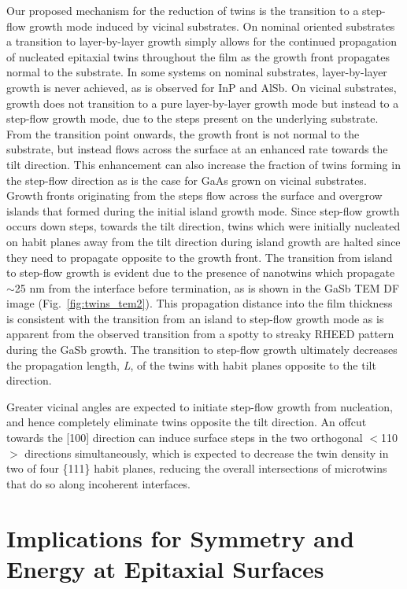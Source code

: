 Our proposed mechanism for the reduction of twins is the transition to a step-flow growth mode induced by vicinal substrates. On nominal oriented substrates a transition to layer-by-layer growth simply allows for the continued propagation of nucleated epitaxial twins throughout the film as the growth front propagates normal to the substrate. In some systems on nominal substrates, layer-by-layer growth is never achieved, as is observed for InP and AlSb. On vicinal substrates, growth does not transition to a pure layer-by-layer growth mode but instead to a step-flow growth mode, due to the steps present on the underlying substrate. From the transition point onwards, the growth front is not normal to the substrate, but instead flows across the surface at an enhanced rate towards the tilt direction. This enhancement can also increase the fraction of twins forming in the step-flow direction as is the case for GaAs grown on vicinal substrates. Growth fronts originating from the steps flow across the surface and overgrow islands that formed during the initial island growth mode. Since step-flow growth occurs down steps, towards the tilt direction, twins which were initially nucleated on habit planes away from the tilt direction during island growth are halted since they need to propagate opposite to the growth front. The transition from island to step-flow growth is evident due to the presence of nanotwins which propagate $\sim$25 nm from the interface before termination, as is shown in the GaSb TEM DF image (Fig.~\ref{fig:twins_tem2}). This propagation distance into the film thickness is consistent with the transition from an island to step-flow growth mode as is apparent from the observed transition from a spotty to streaky RHEED pattern during the GaSb growth. The transition to step-flow growth ultimately decreases the propagation length, \textit{L}, of the twins with habit planes opposite to the tilt direction. 

Greater vicinal angles are expected to initiate step-flow growth from nucleation, and hence completely eliminate twins opposite the tilt direction. An offcut towards the [100] direction can induce surface steps in the two orthogonal $<$110$>$ directions simultaneously\cite{Fang1990}, which is expected to decrease the twin density in two of four \{111\} habit planes, reducing the overall intersections of microtwins that do so along incoherent interfaces.
\section{Implications for Symmetry and Energy at Epitaxial Surfaces}
